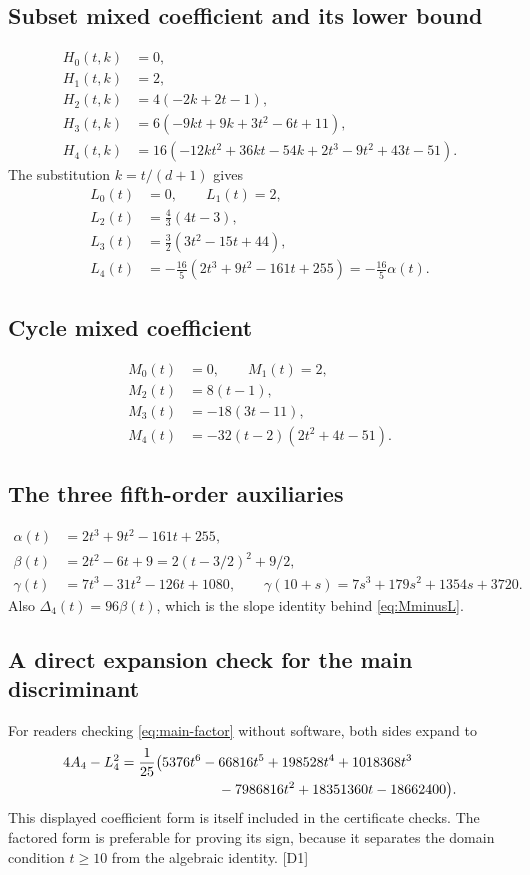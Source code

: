\documentclass[11pt,a4paper]{article}
\numberwithin{equation}{section}
\theoremstyle{definition}
\theoremstyle{remark}
\newcommand{\dup}[1]{{\small\textsf{\color{MutedInk}[#1]}}}
\begin{document}
\subsection{Subset mixed coefficient and its lower bound}
\begin{align*}
 H_0(t,k)&=0,\\
 H_1(t,k)&=2,\\
 H_2(t,k)&=4(-2k+2t-1),\\
 H_3(t,k)&=6(-9kt+9k+3t^2-6t+11),\\
 H_4(t,k)&=16(-12kt^2+36kt-54k+2t^3-9t^2+43t-51).
\end{align*}
The substitution $k=t/(d+1)$ gives
\begin{align*}
 L_0(t)&=0,\qquad L_1(t)=2,\\
 L_2(t)&=\frac43(4t-3),\\
 L_3(t)&=\frac32(3t^2-15t+44),\\
 L_4(t)&=-\frac{16}{5}(2t^3+9t^2-161t+255)=-\frac{16}5\alpha(t).
\end{align*}

\subsection{Cycle mixed coefficient}
\begin{align*}
 M_0(t)&=0,\qquad M_1(t)=2,\\
 M_2(t)&=8(t-1),\\
 M_3(t)&=-18(3t-11),\\
 M_4(t)&=-32(t-2)(2t^2+4t-51).
\end{align*}

\subsection{The three fifth-order auxiliaries}
\begin{align*}
 \alpha(t)&=2t^3+9t^2-161t+255,\\
 \beta(t)&=2t^2-6t+9=2(t-3/2)^2+9/2,\\
 \gamma(t)&=7t^3-31t^2-126t+1080,\qquad
 \gamma(10+s)=7s^3+179s^2+1354s+3720.
\end{align*}
Also $\Delta_4(t)=96\beta(t)$, which is the slope identity behind
\eqref{eq:MminusL}.

\subsection{A direct expansion check for the main discriminant}

For readers checking \eqref{eq:main-factor} without software, both sides
expand to
\begin{align*}
 4A_4-L_4^2={}&\frac1{25}\bigl(
 5376t^6-66816t^5+198528t^4+1018368t^3\\
 &\hspace{20mm}{}-7986816t^2+18351360t-18662400\bigr).
\end{align*}
This displayed coefficient form is itself included in the certificate
checks. The factored form is preferable for proving its sign, because it
separates the domain condition $t\ge10$ from the algebraic identity.
\dup{D1}
\end{document}
